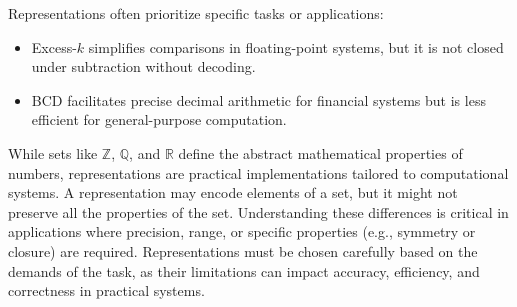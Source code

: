 Representations often prioritize specific tasks or applications:
\begin{itemize}
    \item Excess-\( k \) simplifies comparisons in floating-point systems, but it is not closed under subtraction without decoding.
    \item BCD facilitates precise decimal arithmetic for financial systems but is less efficient for general-purpose computation.
\end{itemize}


While sets like \( \mathbb{Z} \), \( \mathbb{Q} \), and \( \mathbb{R} \) define the abstract mathematical properties of numbers, representations are practical implementations tailored to computational systems. A representation may encode elements of a set, but it might not preserve all the properties of the set. Understanding these differences is critical in applications where precision, range, or specific properties (e.g., symmetry or closure) are required. Representations must be chosen carefully based on the demands of the task, as their limitations can impact accuracy, efficiency, and correctness in practical systems.



